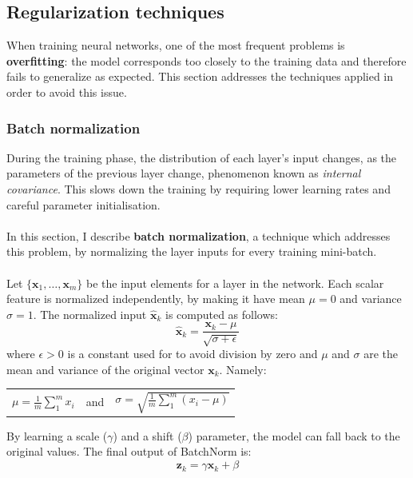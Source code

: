 	\subsection{Regularization techniques} \label{Section: impl/ml/reg}
	When training neural networks, one of the most frequent problems is \textbf{overfitting}: the model corresponds too closely to the training data and therefore fails to generalize as expected. This section addresses the techniques applied in order to avoid this issue.
	\subsubsection{Batch normalization} \label{Section: impl/ml/reg/batch}
	During the training phase, the distribution of each layer's input changes, as the parameters of the previous layer change, phenomenon known as \textit{internal covariance}. This slows down the training by requiring lower learning rates and careful parameter initialisation. 
	\\ \\
	In this section, I describe \textbf{batch normalization}\cite{DBLP:journals/corr/IoffeS15}, a technique which addresses this problem, by normalizing the layer inputs for every training mini-batch. 
	\\ \\
	Let $\{ \mathbf{x}_1, \dots, \mathbf{x}_m  \}$ be the input elements for a layer in the network. Each scalar feature is normalized independently, by making it have mean $\mu = 0$ and variance $\sigma = 1$.  The normalized input $\mathbf{\hat{x}}_k$ is computed as follows:
	\begin{equation}
		\mathbf{\hat{x}}_k = \frac{\mathbf{x}_k - \mu}{\sqrt{\sigma + \epsilon}}
	\end{equation}
	where $\epsilon > 0$ is a constant used for to avoid division by zero and $\mu$ and $\sigma$ are the mean and variance of the original vector $\mathbf{x}_k$. Namely:
	\begin{longtable}{ccc}

				$\mu = \frac{1}{m} \sum_{1}^{m} x_i$

			&   and   &

				$\sigma = \sqrt{\frac{1}{m}\sum_{1}^{m}(x_i - \mu)}$

	\end{longtable}
	By learning a scale ($\gamma$) and a shift ($\beta$) parameter, the model can fall back to the original values. The final output of BatchNorm is: 
	\begin{equation}
		\mathbf{z}_k = \gamma \mathbf{\hat{x}}_k + \beta
	\end{equation} 
